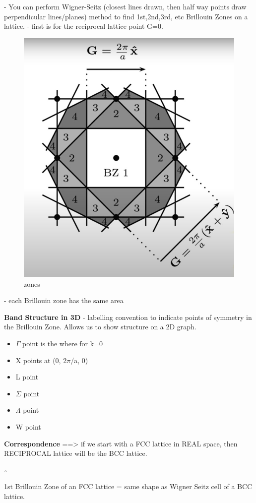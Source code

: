 - You can perform Wigner-Seitz (closest lines drawn, then half way points draw perpendicular lines/planes) method to find 1st,2nd,3rd, etc Brillouin Zones on a lattice.
- first is for the reciprocal lattice point G=0.

\begin{figure}
  \includegraphics[width=0.75\linewidth]{Images/Bzones.jpg}
  \caption{zones}
  \label{fig:zones}
\end{figure}

- each Brillouin zone has the same area

\textbf{Band Structure in 3D}
- labelling convention to indicate points of symmetry in the Brillouin Zone. Allows us to show structure on a 2D graph.
\begin{itemize}
    \item $\Gamma$ point is the where for k=0
    \item X points at (0, 2$\pi$/a, 0)
    \item L point
    \item $\Sigma$ point
    \item $\Lambda$ point 
    \item W point 
\end{itemize}
 

\textbf{Correspondence} ==> if we start with a FCC lattice in REAL space, then RECIPROCAL lattice will be the BCC lattice.

$\therefore$

1st Brillouin Zone of an FCC lattice  = same shape as Wigner Seitz cell of a BCC lattice.

